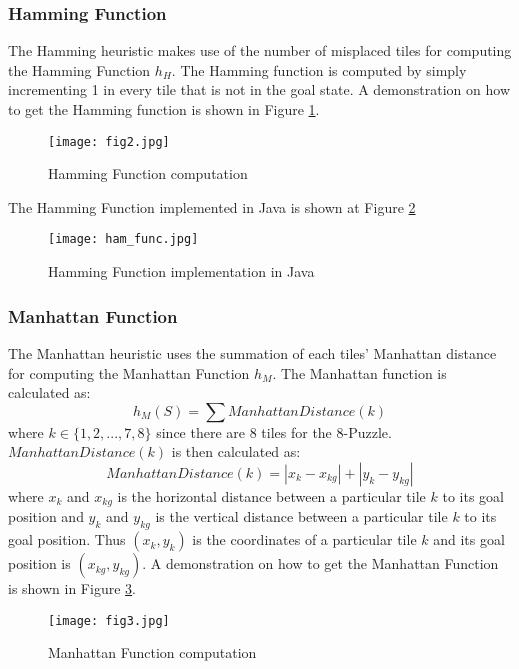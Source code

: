 		\subsubsection{Hamming Function}
			The Hamming heuristic makes use of the number of misplaced tiles for computing the Hamming Function $h_H$. The Hamming function is computed by simply incrementing 1 in every tile that is not in the goal state. A demonstration on how to get the Hamming function is shown in Figure \ref{fig:hamf}.
			\begin{figure}[h]
			\centering
			\texttt{[image: fig2.jpg]}
			\caption{Hamming Function computation}
			\label{fig:hamf}
			\end{figure}

			The Hamming Function implemented in Java is shown at Figure \ref{fig:ham}
			\begin{figure}[h]
			\centering
			\texttt{[image: ham\_func.jpg]}
			\caption{Hamming Function implementation in Java}
			\label{fig:ham}
			\end{figure}

		\subsubsection{Manhattan Function}
			The Manhattan heuristic uses the summation of each tiles' Manhattan distance for computing the Manhattan Function $h_M$. The Manhattan function is calculated as:
			\begin{equation}
			h_M(S) = \sum ManhattanDistance(k)
			\end{equation}
			where $k \in \lbrace 1,2,...,7,8 \rbrace$ since there are 8 tiles for the 8-Puzzle. $ManhattanDistance(k)$ is then calculated as:
			\begin{equation}
			ManhattanDistance(k) = |x_k - x_{kg}| + |y_k - y_{kg}|
			\end{equation}
			where $x_k$ and $x_{kg}$ is the horizontal distance between a particular tile $k$ to its goal position and $y_k$ and $y_{kg}$ is the vertical distance between a particular tile $k$ to its goal position. Thus $(x_k,y_k)$ is the coordinates of a particular tile $k$ and its goal position is $(x_{kg},y_{kg})$. A demonstration on how to get the Manhattan Function is shown in Figure \ref{fig:manf}.
			\begin{figure}[h]
			\centering
			\texttt{[image: fig3.jpg]}
			\caption{Manhattan Function computation}
			\label{fig:manf}
			\end{figure}

